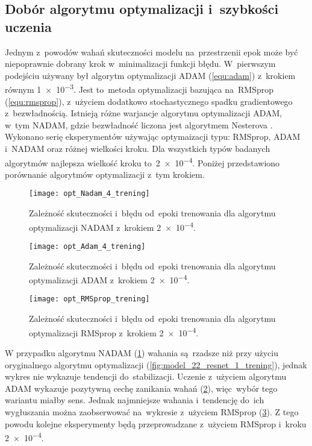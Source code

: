 \subsection{Dobór algorytmu optymalizacji i~szybkości uczenia}

Jednym z~powodów wahań skuteczności modelu na~przestrzenii epok może być niepoprawnie dobrany krok w~minimalizacji funkcji błędu. W~pierwszym podejściu używany był algorytm optymalizacji ADAM (\ref{equ:adam}) z~krokiem równym \num{1e-3}. Jest to~metoda optymalizacji bazująca na~RMSprop (\ref{equ:rmsprop}), z~użyciem dodatkowo stochastycznego spadku gradientowego z~bezwładnością. Istnieją różne warjancje algorytmu optymalizacji ADAM, w~tym NADAM, gdzie bezwładność liczona jest algorytmem Nesterova \cite{Dozat2016IncorporatingNM}. Wykonano serię eksperymentów używając optymaizacji typu: RMSprop, ADAM i~NADAM oraz różnej wielkości kroku. Dla wszystkich typów badanych algorytmów najlepsza wielkość kroku to~\num{2e-4}. Poniżej przedstawiono porównanie algorytmów optymalizacji z~tym krokiem.

\begin{figure}[h!]
	\centering
	\centering
		\texttt{[image: opt\_Nadam\_4\_trening]}	
	\caption{Zależność skuteczności i~błędu od~epoki trenowania dla algorytmu optymalizacji NADAM z~krokiem \num{2e-4}.}	\label{fig:opt_Nadam_4_trening}
\end{figure}

\begin{figure}[h!]
	\centering
	\centering
		\texttt{[image: opt\_Adam\_4\_trening]}	
	\caption{Zależność skuteczności i~błędu od~epoki trenowania dla algorytmu optymalizacji ADAM z~krokiem \num{2e-4}.}	\label{fig:opt_Adam_4_trening}
\end{figure}

\begin{figure}[h!]
	\centering
	\centering
		\texttt{[image: opt\_RMSprop\_trening]}	
	\caption{Zależność skuteczności i~błędu od~epoki trenowania dla algorytmu optymalizacji RMSprop z~krokiem \num{2e-4}.}	\label{fig:opt_RMSprop_trening}
\end{figure}
{\parindent0pt
W przypadku algorytmu NADAM (\ref{fig:opt_Nadam_4_trening}) wahania są~rzadsze niż przy użyciu oryginalnego algorytmu optymalizacji (\ref{fig:model_22_resnet_1_trening}), jednak wykres nie wykazuje tendencji do~stabilizacji. Uczenie z~użyciem algorytmu ADAM wykazuje pozytywną cechę zanikania wahań (\ref{fig:opt_Adam_4_trening}), więc~wybór tego wariantu miałby sens. Jednak najmniejsze wahania i~tendencję do~ich wygłuszania można zaobserwować na~wykresie z~użyciem RMSprop (\ref{fig:opt_RMSprop_trening}). Z tego powodu kolejne eksperymenty będą przeprowadzane z~użyciem RMSprop i~kroku \num{2e-4}.
}

